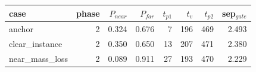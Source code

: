 \begin{tabular}{lrrrrrrr}
\toprule
case & phase & $P_{near}$ & $P_{far}$ & $t_{p1}$ & $t_v$ & $t_{p2}$ & sep$_{gate}$ \\
\midrule
anchor & 2 & 0.324 & 0.676 & 7 & 196 & 469 & 2.493 \\
clear\_instance & 2 & 0.350 & 0.650 & 13 & 207 & 471 & 2.380 \\
near\_mass\_loss & 2 & 0.089 & 0.911 & 27 & 193 & 470 & 2.229 \\
\bottomrule
\end{tabular}
